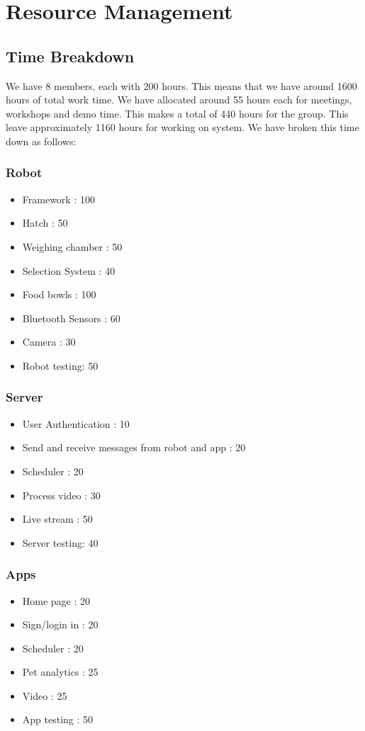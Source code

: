 \section{Resource Management}

    \subsection{Time Breakdown}
    We have 8 members, each with 200 hours. This means that we have around 1600 hours of total work time. We have allocated around 55 hours each for meetings, workshops and demo time. This makes a total of 440 hours for the group. This leave approximately 1160 hours for working on system. We have broken this time down as follows:
     \subsubsection{Robot}
    \begin{itemize}
        \setlength{\itemindent}{.2in}
        \item Framework : 100
        \item Hatch : 50
        \item Weighing chamber : 50
        \item Selection System : 40
        \item Food bowls : 100
        \item Bluetooth Sensors : 60
        \item Camera : 30
        \item Robot testing: 50
    \end{itemize}
     \subsubsection{Server}
    \begin{itemize}
        \setlength{\itemindent}{.2in}
        \item User Authentication : 10
        \item Send and receive messages from robot and app : 20
        \item Scheduler : 20
        \item Process video : 30
        \item Live stream : 50
        \item Server testing: 40
    \end{itemize}
     \subsubsection{Apps}
    \begin{itemize}
        \setlength{\itemindent}{.2in}
        \item Home page : 20
        \item Sign/login in : 20
        \item Scheduler : 20
        \item Pet analytics : 25
        \item Video : 25
        \item App testing : 50
    \end{itemize}

